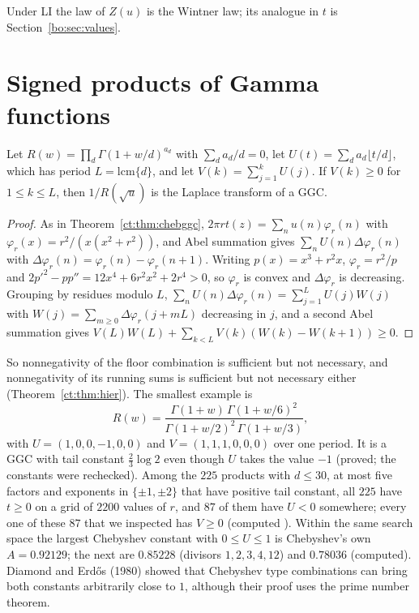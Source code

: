 Under LI the law of $Z(u)$ is the Wintner law; its analogue in $t$ is Section~\ref{bo:sec:values}.

\section{Signed products of Gamma functions}\label{ct:sec:signed}

\begin{theorem}\label{ct:thm:runningsums}
Let $R(w)=\prod_d\Gamma(1+w/d)^{a_d}$ with $\sum_da_d/d=0$, let $U(t)=\sum_da_d\lfloor t/d\rfloor$, which has period $L=\mathrm{lcm}\{d\}$, and let $V(k)=\sum_{j=1}^kU(j)$. If $V(k)\ge0$ for $1\le k\le L$, then $1/R(\sqrt u)$ is the Laplace transform of a GGC.
\end{theorem}
\begin{proof}
As in Theorem~\ref{ct:thm:chebggc}, $2\pi rt(z)=\sum_nu(n)\varphi_r(n)$ with $\varphi_r(x)=r^2/(x(x^2+r^2))$, and Abel summation gives $\sum_nU(n)\Delta\varphi_r(n)$ with $\Delta\varphi_r(n)=\varphi_r(n)-\varphi_r(n+1)$. Writing $p(x)=x^3+r^2x$, $\varphi_r=r^2/p$ and $2p'^2-pp''=12x^4+6r^2x^2+2r^4>0$, so $\varphi_r$ is convex and $\Delta\varphi_r$ is decreasing. Grouping by residues modulo $L$, $\sum_nU(n)\Delta\varphi_r(n)=\sum_{j=1}^LU(j)W(j)$ with $W(j)=\sum_{m\ge0}\Delta\varphi_r(j+mL)$ decreasing in $j$, and a second Abel summation gives $V(L)W(L)+\sum_{k<L}V(k)(W(k)-W(k+1))\ge0$.
\end{proof}

So nonnegativity of the floor combination is sufficient but not necessary, and nonnegativity of its running sums is sufficient but not necessary either (Theorem~\ref{ct:thm:hier}). The smallest example is
\[
R(w)=\frac{\Gamma(1+w)\,\Gamma(1+w/6)^2}{\Gamma(1+w/2)^2\,\Gamma(1+w/3)},
\]
with $U=(1,0,0,-1,0,0)$ and $V=(1,1,1,0,0,0)$ over one period. It is a GGC with tail constant $\frac23\log2$ even though $U$ takes the value $-1$ (proved; the constants were rechecked). Among the $225$ products with $d\le30$, at most five factors and exponents in $\{\pm1,\pm2\}$ that have positive tail constant, all $225$ have $t\ge0$ on a grid of $2200$ values of $r$, and $87$ of them have $U<0$ somewhere; every one of these $87$ that we inspected has $V\ge0$ (computed%
).
Within the same search space the largest Chebyshev constant with $0\le U\le1$ is Chebyshev's own $A=0.92129$; the next are $0.85228$ (divisors $1,2,3,4,12$) and $0.78036$ (computed). %
Diamond and Erd\H{o}s (1980) showed that Chebyshev type combinations can bring both constants arbitrarily close to $1$, although their proof uses the prime number theorem.
